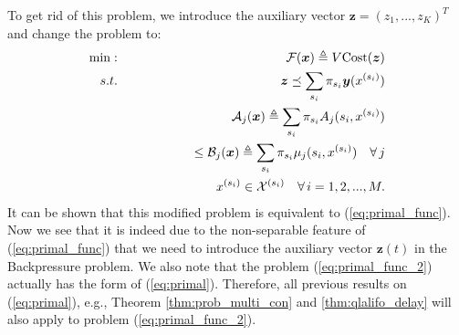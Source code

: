 \documentclass[journal]{IEEEtran}
\newcommand{\bv}[1]{{\boldsymbol{#1} }}
\newcommand{\script}[1]{{{\cal{#1} }}}
\begin{document}
To get rid of this problem, we introduce the auxiliary vector $\bv{z}=(z_1, ..., z_K)^T$ and change the problem to:
\begin{eqnarray}
\min:&&\script{F}(\bv{x})\triangleq V\text{Cost}(\bv{z})\label{eq:primal_func_2}\\
s.t. &&  \qquad\bv{z}\preceq \sum_{s_i}\pi_{s_i}\bv{y}(x^{(s_i)})\nonumber\\
&&\script{A}_j(\bv{x})\triangleq\sum_{s_i}\pi_{s_i}A_j(s_i, x^{(s_i)})\nonumber\\
&&\qquad\qquad\quad\leq \script{B}_j(\bv{x})\triangleq\sum_{s_i}\pi_{s_i}\mu_j(s_i, x^{(s_i)})\quad\forall\, j\nonumber\\
&& x^{(s_i)}\in \script{X}^{(s_i)}\quad \forall\, i=1, 2, ..., M.\nonumber
\end{eqnarray}
It can be shown that this modified problem is equivalent to (\ref{eq:primal_func}). 
Now we see that it is indeed due to the non-separable feature of (\ref{eq:primal_func}) that we need to introduce the auxiliary vector $\bv{z}(t)$ in the Backpressure problem. 
We also  note that the problem (\ref{eq:primal_func_2}) actually has the form of (\ref{eq:primal}). Therefore, all previous results on (\ref{eq:primal}), e.g., Theorem \ref{thm:prob_multi_con} and \ref{thm:qlalifo_delay} will also apply to problem (\ref{eq:primal_func_2}). 

\vspace{-.2in}
\end{document}
